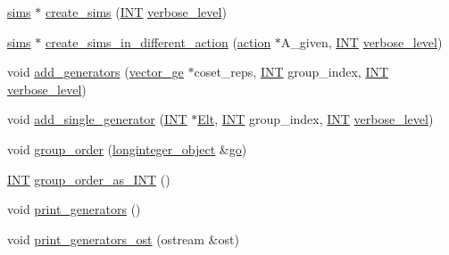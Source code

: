 \begin{DoxyCompactItemize}
\item 
\mbox{\hyperlink{classsims}{sims}} $\ast$ \mbox{\hyperlink{classstrong__generators_afca700d50772a39eeb74239355ae67e1}{create\+\_\+sims}} (\mbox{\hyperlink{galois_8h_a09fddde158a3a20bd2dcadb609de11dc}{I\+NT}} \mbox{\hyperlink{simeon_8_c_a818073fbcc2f439e7c56952f67386122}{verbose\+\_\+level}})
\item 
\mbox{\hyperlink{classsims}{sims}} $\ast$ \mbox{\hyperlink{classstrong__generators_a03628c036a640593674adce3b15b3c7d}{create\+\_\+sims\+\_\+in\+\_\+different\+\_\+action}} (\mbox{\hyperlink{classaction}{action}} $\ast$A\+\_\+given, \mbox{\hyperlink{galois_8h_a09fddde158a3a20bd2dcadb609de11dc}{I\+NT}} \mbox{\hyperlink{simeon_8_c_a818073fbcc2f439e7c56952f67386122}{verbose\+\_\+level}})
\item 
void \mbox{\hyperlink{classstrong__generators_a75299be04feeb9809ebc0bc9c809410e}{add\+\_\+generators}} (\mbox{\hyperlink{classvector__ge}{vector\+\_\+ge}} $\ast$coset\+\_\+reps, \mbox{\hyperlink{galois_8h_a09fddde158a3a20bd2dcadb609de11dc}{I\+NT}} group\+\_\+index, \mbox{\hyperlink{galois_8h_a09fddde158a3a20bd2dcadb609de11dc}{I\+NT}} \mbox{\hyperlink{simeon_8_c_a818073fbcc2f439e7c56952f67386122}{verbose\+\_\+level}})
\item 
void \mbox{\hyperlink{classstrong__generators_a962faa508bd0743eca2be812957df7cc}{add\+\_\+single\+\_\+generator}} (\mbox{\hyperlink{galois_8h_a09fddde158a3a20bd2dcadb609de11dc}{I\+NT}} $\ast$\mbox{\hyperlink{simeon_8_c_aec1406935bdb1fee3561fcb840964100}{Elt}}, \mbox{\hyperlink{galois_8h_a09fddde158a3a20bd2dcadb609de11dc}{I\+NT}} group\+\_\+index, \mbox{\hyperlink{galois_8h_a09fddde158a3a20bd2dcadb609de11dc}{I\+NT}} \mbox{\hyperlink{simeon_8_c_a818073fbcc2f439e7c56952f67386122}{verbose\+\_\+level}})
\item 
void \mbox{\hyperlink{classstrong__generators_a91f453c2bfd6502b96f4b4eed16beb20}{group\+\_\+order}} (\mbox{\hyperlink{classlonginteger__object}{longinteger\+\_\+object}} \&\mbox{\hyperlink{simeon_8_c_a1516b736c8ebbfb03a9dd7d8826cd9a6}{go}})
\item 
\mbox{\hyperlink{galois_8h_a09fddde158a3a20bd2dcadb609de11dc}{I\+NT}} \mbox{\hyperlink{classstrong__generators_affe9b7cbb7c05b58545303065a26a2cc}{group\+\_\+order\+\_\+as\+\_\+\+I\+NT}} ()
\item 
void \mbox{\hyperlink{classstrong__generators_adccd259b435afd96d89cd664daa6c897}{print\+\_\+generators}} ()
\item 
void \mbox{\hyperlink{classstrong__generators_a7d93ea4f786018272e813207f3c124b4}{print\+\_\+generators\+\_\+ost}} (ostream \&ost)

\end{DoxyCompactItemize}
